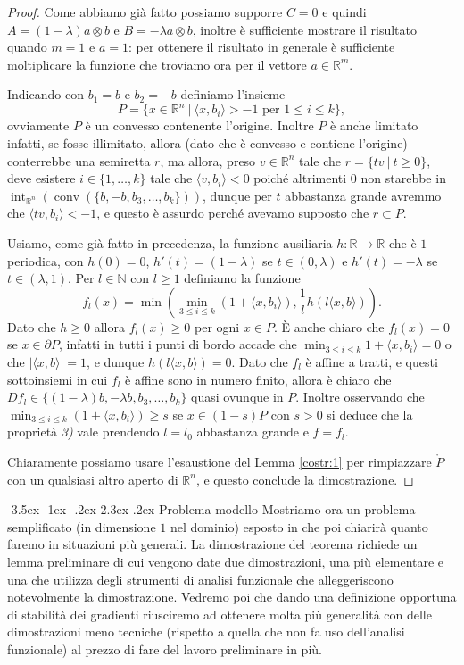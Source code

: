 \documentclass[a4paper,11pt]{book}
\makeatletter
\theoremstyle{plain}
\theoremstyle{definition}
\theoremstyle{remark}
\newcommand{\R}{\mathbb{R}}
\newcommand{\N}{\mathbb{N}}
\newcommand{\scal}[2]{\langle #1,#2 \rangle}
\DeclareMathOperator{\Int}{int}
\DeclareMathOperator{\conv}{conv}
\renewcommand\section{\@startsection {section}{1}{\z@}%
                                   {-3.5ex \@plus -1ex \@minus -.2ex}%
                                   {2.3ex \@plus.2ex}%
                                   {\normalfont\Large\bfseries}}
\makeatother
\begin{document}
\begin{proof}
	Come abbiamo già fatto possiamo supporre $C=0$ e quindi $A=(1-\lambda)a\otimes b$ e $B=-\lambda a\otimes b$, inoltre è sufficiente mostrare il risultato quando $m=1$ e $a=1$: per ottenere il risultato in generale è sufficiente moltiplicare la funzione che troviamo ora per il vettore $a\in\R^{m}$.
	
	Indicando con $b_{1}=b$ e $b_{2}=-b$ definiamo l'insieme
	\[
		P=\{x\in\R^{n}\ |\ \scal{x}{b_{i}}>-1\text{ per }1\leq i\leq k\},
	\]
	ovviamente $P$ è un convesso contenente l'origine. Inoltre $P$ è anche limitato infatti, se fosse illimitato, allora (dato che è convesso e contiene l'origine) conterrebbe una semiretta $r$, ma allora, preso $v\in\R^{n}$ tale che $r=\{tv\ |\ t\geq 0\}$, deve esistere $i\in\{1,\ldots,k\}$ tale che $\scal{v}{b_{i}}<0$ poiché altrimenti $0$ non starebbe in $\Int_{\R^{n}}(\conv(\{b,-b,b_{3},\ldots,b_{k}\}))$, dunque per $t$ abbastanza grande avremmo che $\scal{tv}{b_{i}}<-1$, e questo è assurdo perché avevamo supposto che $r\subset P$.
	
	Usiamo, come già fatto in precedenza, la funzione ausiliaria $h:\R\to\R$ che è $1$-periodica, con $h(0)=0$, $h'(t)=(1-\lambda)$ se $t\in(0,\lambda)$ e $h'(t)=-\lambda$ se $t\in(\lambda,1)$. Per $l\in\N$ con $l\geq 1$ definiamo la funzione
	\[
		f_{l}(x)=\min\left(\min_{3\leq i\leq k}(1+\scal{x}{b_{i}}),\frac{1}{l}h(l\scal{x}{b})\right).
	\]
	Dato che $h\geq 0$ allora $f_{l}(x)\geq 0$ per ogni $x\in P$. È anche chiaro che $f_{l}(x)=0$ se $x\in\partial P$, infatti in tutti i punti di bordo accade che $\min_{3\leq i\leq k}1+\scal{x}{b_{i}}=0$ o che $|\scal{x}{b}|=1$, e dunque $h(l\scal{x}{b})=0$. Dato che $f_{l}$ è affine a tratti, e questi sottoinsiemi in cui $f_{l}$ è affine sono in numero finito, allora è chiaro che $Df_{l}\in\{(1-\lambda)b,-\lambda b, b_{3},\ldots,b_{k}\}$ quasi ovunque in $P$. Inoltre osservando che $\min_{3\leq i\leq k}(1+\scal{x}{b_{i}})\geq s$ se $x\in (1-s)P$ con $s>0$ si deduce che la proprietà \textit{3)} vale prendendo $l=l_{0}$ abbastanza grande e $f=f_{l}$.
	
	Chiaramente possiamo usare l'esaustione del Lemma \ref{costr:1} per rimpiazzare $\mathring{P}$ con un qualsiasi altro aperto di $\R^{n}$, e questo conclude la dimostrazione.
\end{proof}


\section{Problema modello}
Mostriamo ora un problema semplificato (in dimensione $1$ nel dominio) esposto in \cite{cellina} che poi chiarirà quanto faremo in situazioni più generali. La dimostrazione del teorema richiede un lemma preliminare di cui vengono date due dimostrazioni, una più elementare e una che utilizza degli strumenti di analisi funzionale che alleggeriscono notevolmente la dimostrazione. Vedremo poi che dando una definizione opportuna di stabilità dei gradienti riusciremo ad ottenere molta più generalità con delle dimostrazioni meno tecniche (rispetto a quella che non fa uso dell'analisi funzionale) al prezzo di fare del lavoro preliminare in più.
\end{document}
